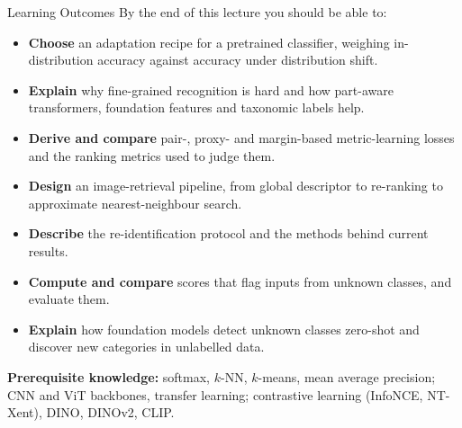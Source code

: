 \begin{frame}{Learning Outcomes}
  By the end of this lecture you should be able to:
  \begin{itemize}\footnotesize\itemsep0.25em
    \item \textbf{Choose} an adaptation recipe for a pretrained classifier, weighing in-distribution accuracy against accuracy under distribution shift.
    \item \textbf{Explain} why fine-grained recognition is hard and how part-aware transformers, foundation features and taxonomic labels help.
    \item \textbf{Derive and compare} pair-, proxy- and margin-based metric-learning losses and the ranking metrics used to judge them.
    \item \textbf{Design} an image-retrieval pipeline, from global descriptor to re-ranking to approximate nearest-neighbour search.
    \item \textbf{Describe} the re-identification protocol and the methods behind current results.
    \item \textbf{Compute and compare} scores that flag inputs from unknown classes, and evaluate them.
    \item \textbf{Explain} how foundation models detect unknown classes zero-shot and discover new categories in unlabelled data.
  \end{itemize}
  \vspace{0.3em}
  {\footnotesize \textbf{Prerequisite knowledge:} softmax, $k$-NN, $k$-means, mean average precision; CNN and ViT backbones, transfer learning; contrastive learning (InfoNCE, NT-Xent), DINO, DINOv2, CLIP.\par}
\end{frame}
